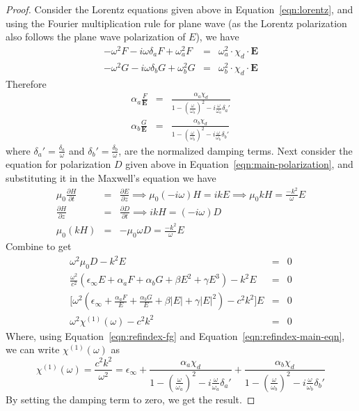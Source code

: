 \documentclass{article}[12pt]
\theoremstyle{plain}
\begin{document}
\begin{proof}
Consider the Lorentz equations given above in Equation~\ref{eqn:lorentz}, and using the Fourier multiplication rule for plane wave (as the 
Lorentz polarization also follows the plane wave polarization of $E$), we have
\begin{eqnarray}
-\omega^2 F - i\omega\delta_a F + \omega_a^2 F & = & \omega_a^2 \cdot \chi_d \cdot \mathbf{E} \nonumber \\
-\omega^2 G - i\omega\delta_b G + \omega_b^2 G & = & \omega_b^2 \cdot \chi_d \cdot \mathbf{E} 
\end{eqnarray}
Therefore
\begin{eqnarray}
\alpha_a \frac{F}{\mathbf{E}} & = & \frac{\alpha_a \chi_d}{1-(\frac{\omega}{\omega_a})^2-i\frac{\omega}{\omega_a}\delta_a'} \nonumber \\
\alpha_b \frac{G}{\mathbf{E}} & = & \frac{\alpha_b \chi_d}{1-(\frac{\omega}{\omega_b})^2-i\frac{\omega}{\omega_b}\delta_b'} \label{eqn:refindex-fg}
\end{eqnarray}
where $\delta_a'=\frac{\delta_a}{\omega}$ and $\delta_b'=\frac{\delta_b}{\omega}$, are the normalized damping terms.
Next consider the equation for polarization $D$ given above in Equation~\ref{eqn:main-polarization}, and substituting it in the Maxwell's equation we have
\begin{eqnarray}
\mu_0\frac{\partial H}{\partial t} & = & \frac{\partial E}{\partial z} \implies \mu_0(-i\omega)H = i k E \implies \mu_0 k H = \frac{-k^2}{\omega}E \nonumber \\
\frac{\partial H}{\partial z} & = & \frac{\partial D}{\partial t} \implies i k H = (-i \omega) D \nonumber \\
\mu_0 (k H) & = & -\mu_0 \omega D = \frac{-k^2}{\omega} E \nonumber
\end{eqnarray}
Combine to get
\begin{eqnarray}
\omega^2 \mu_0 D - k^2 E & = & 0 \nonumber \\
\frac{\omega^2}{c^2}(\epsilon_\infty E + \alpha_a F + \alpha_b G + \beta E^2 + \gamma E^3) - k^2 E & = & 0 \nonumber \\
\Big[\omega^2(\epsilon_\infty + \frac{\alpha_a F}{E} + \frac{\alpha_b G}{E} + \beta |E| + \gamma |E|^2) - c^2 k^2\Big] E & = & 0 \nonumber \\
\omega^2 \chi^{(1)}(\omega) - c^2 k^2 & = & 0 \label{eqn:refindex-main-eqn}
\end{eqnarray}
Where, using Equation~\ref{eqn:refindex-fg} and Equation~\ref{eqn:refindex-main-eqn}, we can write $\chi^{(1)}(\omega)$ as
\[
\chi^{(1)}(\omega) = \frac{c^2 k^2}{\omega^2} = \epsilon_\infty + \frac{\alpha_a \chi_d}{1-(\frac{\omega}{\omega_a})^2-i\frac{\omega}{\omega_a}\delta_a'}
+ \frac{\alpha_b \chi_d}{1-(\frac{\omega}{\omega_b})^2-i\frac{\omega}{\omega_b}\delta_b'} 
\]
By setting the damping term to zero, we get the result.
\end{proof}
\end{document}
